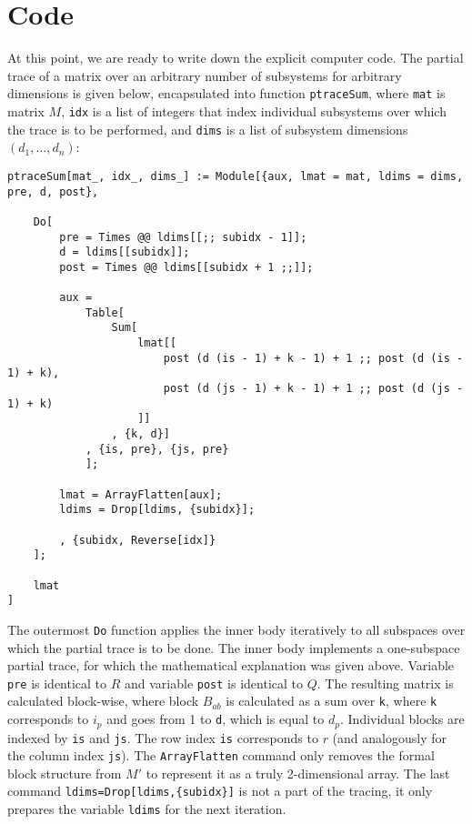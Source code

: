 \documentclass[nofootinbib,superscriptaddress,longbibliography,a4paper,amsfonts]{revtex4-2}
\begin{document}
\section{Code}

At this point, we are ready to write down the explicit computer code. The partial trace of a matrix over an arbitrary number of subsystems for arbitrary dimensions is given below, encapsulated into function \verb+ptraceSum+, where \verb+mat+ is matrix $M$, \verb+idx+ is a list of integers that index individual subsystems over which the trace is to be performed, and \verb+dims+ is a list of subsystem dimensions $(d_1, \ldots, d_n)$:

\begin{verbatim}
ptraceSum[mat_, idx_, dims_] := Module[{aux, lmat = mat, ldims = dims, pre, d, post},
  
    Do[
        pre = Times @@ ldims[[;; subidx - 1]];
        d = ldims[[subidx]];
        post = Times @@ ldims[[subidx + 1 ;;]];
   
        aux = 
            Table[
                Sum[
                    lmat[[
                        post (d (is - 1) + k - 1) + 1 ;; post (d (is - 1) + k),
                        post (d (js - 1) + k - 1) + 1 ;; post (d (js - 1) + k)
                    ]]
                , {k, d}]
            , {is, pre}, {js, pre}
            ];
   
        lmat = ArrayFlatten[aux];
        ldims = Drop[ldims, {subidx}];
   
        , {subidx, Reverse[idx]}
    ];
  
    lmat
]
\end{verbatim}

The outermost \verb+Do+ function applies the inner body iteratively to all subspaces over which the partial trace is to be done. The inner body implements a one-subspace partial trace, for which the mathematical explanation was given above. Variable \verb+pre+ is identical to $R$ and variable \verb+post+ is identical to $Q$. The resulting matrix is calculated block-wise, where block $B_{ab}$ is calculated as a sum over \verb+k+, where \verb+k+ corresponds to $i_p$ and goes from 1 to \verb+d+, which is equal to $d_p$. Individual blocks are indexed by \verb+is+ and \verb+js+. The row index \verb+is+ corresponds to $r$ (and analogously for the column index \verb+js+). The \verb+ArrayFlatten+ command only removes the formal block structure from $M'$ to represent it as a truly 2-dimensional array. The last command \verb+ldims=Drop[ldims,{subidx}]+ is not a part of the tracing, it only prepares the variable \verb+ldims+ for the next iteration.
\end{document}
